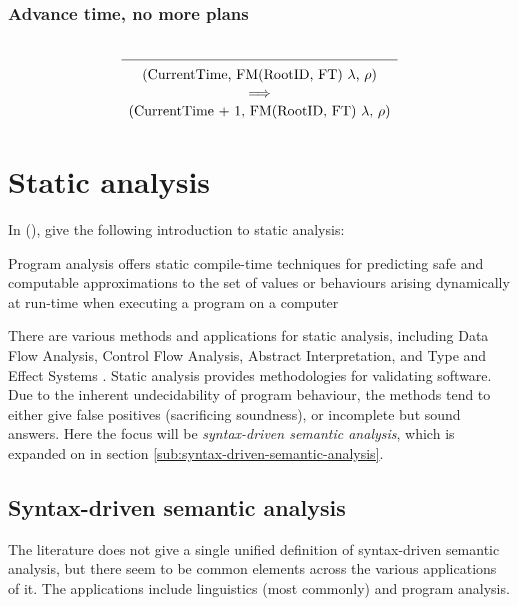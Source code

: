 \documentclass[a4paper,english]{ifimaster}
\begin{document}
\subsubsection*{Advance time, no more plans}
\begin{equation*}
    \begin{array}{c}
    \\[1pt]
    \hline\\[-7pt]
    \text{(CurrentTime, FM(RootID, FT) $\lambda$, $\rho$)}\\[1pt]
    \implies \\[1pt]
    \text{(CurrentTime + 1, FM(RootID, FT) $\lambda$, $\rho$)}\\[1pt]
    \end{array}
\end{equation*}

\section{Static analysis}
\label{sec:static-analysis}
In  (\citeyear{book:principles-of-program-analysis}), \citeauthor*{book:principles-of-program-analysis} give the following introduction to static analysis:
\begin{displayquote}
Program analysis offers static compile-time techniques for predicting safe and computable approximations to the set of values or behaviours arising dynamically at run-time when executing a program on a computer
\end{displayquote}
There are various methods and applications for static analysis, including Data Flow Analysis, Control Flow Analysis, Abstract Interpretation, and Type and Effect Systems \parencite{book:principles-of-program-analysis}. Static analysis provides methodologies for validating software. Due to the inherent undecidability of program behaviour, the methods tend to either give false positives (sacrificing soundness), or incomplete but sound answers. %
Here the focus will be \emph{syntax-driven semantic analysis}, which is expanded on in section \vref{sub:syntax-driven-semantic-analysis}. 
\subsection{Syntax-driven semantic analysis}
\label{sub:syntax-driven-semantic-analysis}
The literature does not give a single unified definition of syntax-driven semantic analysis, but there seem to be common elements across the various applications of it. The applications include linguistics (most commonly) and program analysis.
\end{document}
